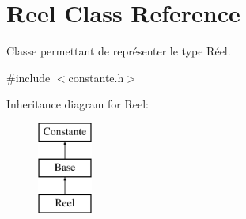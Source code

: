 \hypertarget{class_reel}{\section{Reel Class Reference}
\label{class_reel}
}


Classe permettant de représenter le type Réel.  




{\ttfamily \#include $<$constante.\-h$>$}

Inheritance diagram for Reel\-:\begin{figure}[H]
\begin{center}
\leavevmode
\includegraphics[height=3.000000cm]{class_reel}
\end{center}
\end{figure}
